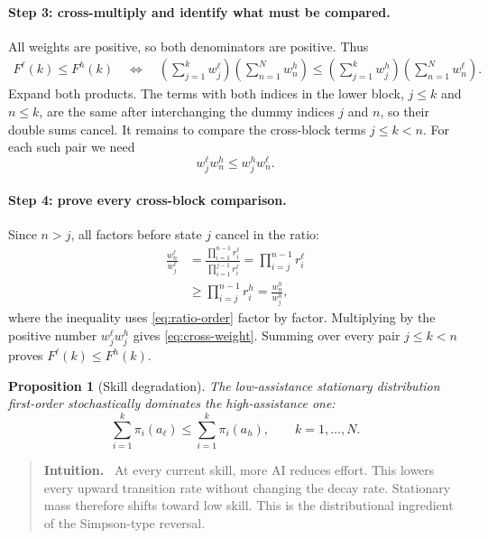 \documentclass[11pt]{article}
\theoremstyle{tutorial}
\newtheorem{proposition}[theorem]{Proposition}
\theoremstyle{remark}
\newenvironment{intuition}{\begin{quote}\color{teal}\textbf{Intuition.}\ }{\end{quote}}
\newcommand{\1}{\mathbb{I}}
\begin{document}
\paragraph{Step 3: cross-multiply and identify what must be compared.}
All weights are positive, so both denominators are positive.  Thus
\begin{align*}
F^\ell(k)\le F^h(k)
\quad\Longleftrightarrow\quad
\left(\sum_{j=1}^k w_j^\ell\right)
\left(\sum_{n=1}^N w_n^h\right)
\le
\left(\sum_{j=1}^k w_j^h\right)
\left(\sum_{n=1}^N w_n^\ell\right).
\end{align*}
Expand both products.  The terms with both indices in the lower block, $j\le k$ and $n\le k$, are the
same after interchanging the dummy indices $j$ and $n$, so their double sums cancel.  It remains to compare
the cross-block terms $j\le k<n$.  For each such pair we need
\begin{equation}
  w_j^\ell w_n^h\le w_j^h w_n^\ell.
  \label{eq:cross-weight}
\end{equation}

\paragraph{Step 4: prove every cross-block comparison.}
Since $n>j$, all factors before state $j$ cancel in the ratio:
\begin{align*}
\frac{w_n^\ell}{w_j^\ell}
&=\frac{\prod_{i=1}^{n-1}r_i^\ell}
        {\prod_{i=1}^{j-1}r_i^\ell}
=\prod_{i=j}^{n-1}r_i^\ell\\
&\ge\prod_{i=j}^{n-1}r_i^h
=\frac{w_n^h}{w_j^h},
\end{align*}
where the inequality uses \eqref{eq:ratio-order} factor by factor.  Multiplying by the positive number
$w_j^\ell w_j^h$ gives \eqref{eq:cross-weight}.  Summing over every pair $j\le k<n$ proves
$F^\ell(k)\le F^h(k)$.

\begin{proposition}[Skill degradation]
The low-assistance stationary distribution first-order stochastically dominates the high-assistance one:
\[
  \sum_{i=1}^k\pi_i(a_\ell)\le\sum_{i=1}^k\pi_i(a_h),\qquad k=1,\ldots,N.
\]
\end{proposition}

\begin{intuition}
At every current skill, more AI reduces effort.  This lowers every upward transition rate without changing
the decay rate.  Stationary mass therefore shifts toward low skill.  This is the distributional ingredient of
the Simpson-type reversal.
\end{intuition}
\end{document}
